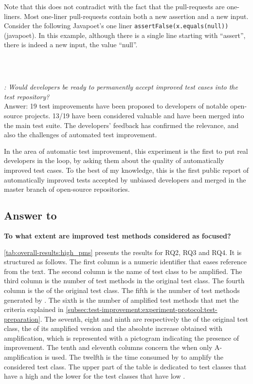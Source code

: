 Note that this does not contradict with the fact that the pull-requests are one-liners.
Most one-liner pull-requests contain both a new assertion and a new input. Consider the following Javapoet's one liner \texttt{assertFalse(x.equals(null))} (javapoet). 
In this example, although there is a single line starting with ``assert'', there is indeed a new input, the value ``null''.

~\\
~\\
\begin{mdframed}
	\textit{\rqpullrequest: Would developers be ready to permanently accept improved test cases into the test repository?}\\
	Answer: 19 test improvements have been proposed to developers of notable open-source projects. 
	13/19 have been considered valuable and have been merged into the main test suite. 
	The developers' feedback has confirmed the relevance, and also the challenges of automated test improvement.
\end{mdframed}

In the area of automatic test improvement, this experiment is the first to put real developers in the loop, by asking them about the quality of automatically improved test cases.
To the best of my knowledge, this is the first public report of automatically improved tests accepted by unbiased developers and merged in the master branch of open-source repositories.




\subsection{Answer to \rqcandidates{}}

\textbf{\rqcandidates{} To what extent are improved test methods considered as focused?}

\autoref{tab:overall-results:high_pms}
presents the results for RQ2, RQ3 and RQ4.%
It is structured as follows.
The first column is a numeric identifier that eases reference from the text.
The second column is the name of test class to be amplified.
The third column is the number of test methods in the original test class.
The fourth column is the \ms of the original test class.
The fifth is the number of test methods generated by \dspot.
The sixth is the number of amplified test methods that met the criteria explained in \autoref{subsec:test-improvement:experiment-protocol:test-preparation}.
The seventh, eight and ninth are respectively the \ams of the original test class, the \ams of its amplified version and the absolute increase obtained with amplification, which is represented with a pictogram indicating the presence of improvement. 
The tenth and eleventh columns concern the \ams when only A-amplification is used.
The twelfth is the time consumed by \dspot to amplify the considered test class. 
The upper part of the table is dedicated to test classes that have a high \ms and the lower for the test classes that have low \ms.

